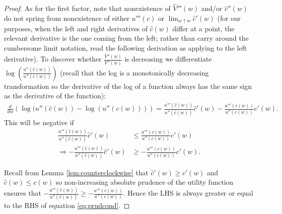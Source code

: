\documentclass[titlepage]{\econtex}
\begin{document}
\begin{proof}
    As for the first factor, note that nonexistence of 	$\hat{V}'''(w)$ and/or $\hat{c}''(w)$ do not spring from nonexistence of either $u'''(c)$ or $\lim_{w \uparrow w} \hat{c}'(w)$ (for our purposes, when the left and right derivatives of $\hat{c}(w)$ differ at a point, the relevant derivative is the one coming from the left; rather than carry around the cumbersome limit notation, read the following derivation as applying to the left derivative).  To discover whether $\frac{\hat {V}''(w)}{V''(w)}$ is decreasing we differentiate $\log\left(\frac{u''(\hat{c}(w))}{ u''(c(w))}\right)$ (recall that the log is a monotonically decreasing transformation so the derivative of the log of a function always has the same sign as the derivative of the function):
    \begin{align*}
      \frac{d}{d w}\left( \log(u''(\hat{c}(w)) - \log(u''(c(w)))\right) = \frac{u'''(\hat{c}(w))}{u''(\hat{c}(w))}\hat{c}'(w) -  \frac{u'''(c(w))}{u''(c(w))}c'(w).
    \end{align*}
    This will be negative if
    \begin{align}
      \frac{u'''(\hat{c}(w))}{u''(\hat{c}(w))}\hat{c}'(w) & \leq  \frac{u'''(c(w))}{u''(c(w))}c'(w) \nonumber
      \\ \Rightarrow  -\frac{u'''(\hat{c}(w))}{u''(\hat{c}(w))}\hat{c}'(w) & \geq  -\frac{u'''(c(w))}{u''(c(w))} c'(w) \label{eq:prudcond} .
    \end{align}
    
    Recall from Lemma \ref{lem:counterclockwise} that $\hat{c}'(w) \geq c'(w)$ and $\hat{c}(w) \leq c(w)$ so non-increasing absolute prudence of the utility function ensures that $-\frac{u'''(\hat{c}(w))}{u''(\hat{c}(w))} \geq  -\frac{u'''(c(w))}{u''(c(w))}$. Hence the LHS is always greater or equal to the RHS of equation \eqref{eq:prudcond}. 
    
  \end{proof}
\end{document}
